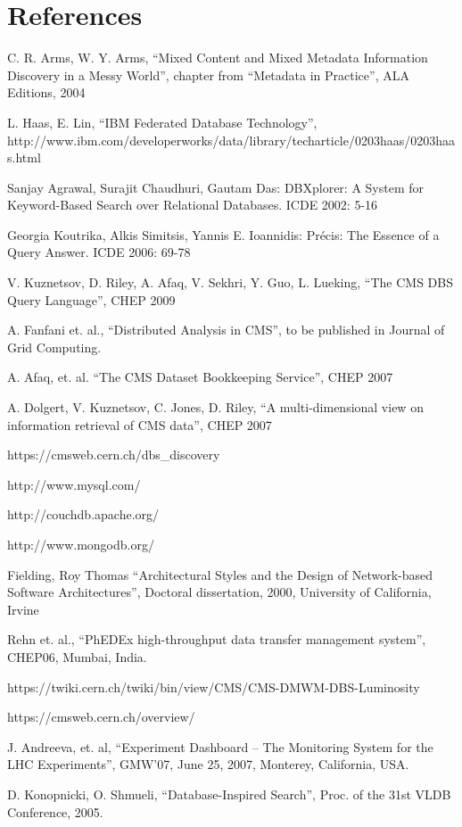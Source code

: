 \documentclass[a4paper]{jpconf}
\begin{document}
\section*{References}
\begin{thebibliography}{9}
C. R. Arms, W. Y. Arms, ``Mixed Content and Mixed Metadata 
Information Discovery in a Messy World'',
chapter from ``Metadata in Practice'', ALA Editions, 2004

L. Haas, E. Lin,
``IBM Federated Database Technology'', \\
http://www.ibm.com/developerworks/data/library/techarticle/0203haas/0203haas.html

Sanjay Agrawal, Surajit Chaudhuri, Gautam Das: DBXplorer: A System for
Keyword-Based Search over Relational Databases. ICDE 2002: 5-16

Georgia Koutrika, Alkis Simitsis, Yannis E. Ioannidis: Pr\'{e}cis: The Essence of
a Query Answer. ICDE 2006: 69-78

 V. Kuznetsov, D. Riley, A. Afaq, V. Sekhri, Y. Guo, L. Lueking,
``The CMS DBS Query Language'', CHEP 2009

 A. Fanfani et. al.,
``Distributed Analysis in CMS'', to be published in Journal of Grid Computing.

 A. Afaq, et. al. ``The CMS Dataset Bookkeeping Service'', CHEP 2007 

 A. Dolgert, V. Kuznetsov, C. Jones, D. Riley, 
``A multi-dimensional view on information retrieval of CMS data'', CHEP 2007

 https://cmsweb.cern.ch/dbs\_discovery

http://www.mysql.com/

http://couchdb.apache.org/

http://www.mongodb.org/

Fielding, Roy Thomas ``Architectural Styles and the Design of 
Network-based Software Architectures'', Doctoral dissertation, 2000,
University of California, Irvine

Rehn et. al.,
``PhEDEx high-throughput data transfer management system'', CHEP06, Mumbai, India.



https://twiki.cern.ch/twiki/bin/view/CMS/CMS-DMWM-DBS-Luminosity


https://cmsweb.cern.ch/overview/

J. Andreeva, et. al,
``Experiment Dashboard – The Monitoring System for the LHC Experiments'',
GMW’07, June 25, 2007, Monterey, California, USA.

D. Konopnicki, O. Shmueli,
``Database-Inspired Search'', 
Proc. of the 31st VLDB Conference, 2005.
\end{thebibliography}
\end{document}
